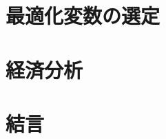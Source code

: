 \documentclass[11pt,aspectratio=43,dvipsnames]{beamer}
\begin{document}
\setcounter{framenumber}{14}
\section{最適化変数の選定}
\section{経済分析}
\section{結言}
\end{document}
